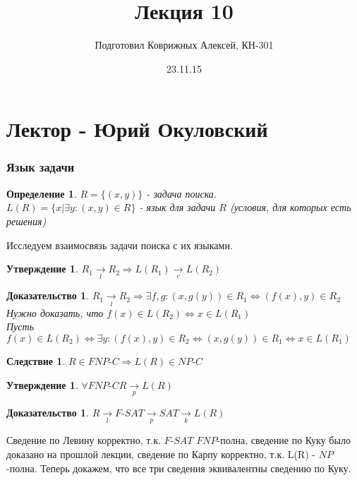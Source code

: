 \documentclass{beamer}
\title{Лекция 10}
\author{Подготовил Коврижных Алексей, КН-301}
\theoremstyle{plain}
\newtheorem{state}[thm]{Утверждение}
\newtheorem{cor}[thm]{Следствие}
\newtheorem{proof-rus}[thm]{Доказательство}
\newtheorem{dfn}[thm]{Определение}
\theoremstyle{definition}
\begin{document}
\date{23.11.15}



\section{Лектор - Юрий Окуловский}

\begin{frame}
    \frametitle{Язык задачи}
    \begin{dfn}
        $R = \{(x, y)\}$ - задача поиска. \\
        $L(R) = \{x | \exists y:(x,y) \in R\}$ - язык для задачи $R$ (условия, для которых есть решения)
    \end{dfn}
    Исследуем взаимосвязь задачи поиска с их языками.
    \begin{state}
        $R_1 \xrightarrow[l]{} R_2 \Rightarrow L(R_1) \xrightarrow[c]{} L(R_2)$
    \end{state}
    \begin{proof-rus}
        $R_1 \xrightarrow[l]{} R_2 \Rightarrow \exists f,g:(x, g(y)) \in R_1 \Leftrightarrow (f(x), y) \in R_2$ \\
        Нужно доказать, что $f(x) \in L(R_2) \Leftrightarrow x \in L(R_1)$ \\
        Пусть $f(x) \in L(R_2) \Leftrightarrow \exists y:(f(x),y) \in R_2 \Leftrightarrow (x, g(y)) \in R_1 \Leftrightarrow x \in L(R_1)$
    \end{proof-rus}
\end{frame}

\begin{frame}
    \begin{cor}
        $R \in FNP\text{-}C \Rightarrow L(R) \in NP\text{-}C$
    \end{cor}
    \begin{state}
        $\forall FNP\text{-}C R \xrightarrow[p]{} L(R)$
    \end{state}
    \begin{proof-rus}
        $R \xrightarrow[l]{} F\text{-}SAT \xrightarrow[p]{} SAT \xrightarrow[k]{} L(R)$
    \end{proof-rus}
    Сведение по Левину корректно, т.к. $F\text{-}SAT$ $FNP$-полна, сведение по Куку было доказано на прошлой лекции, сведение по Карпу корректно, т.к. L(R) - $NP$-полна.
    Теперь докажем, что все три сведения эквивалентны сведению по Куку.
\end{frame}
\end{document}
